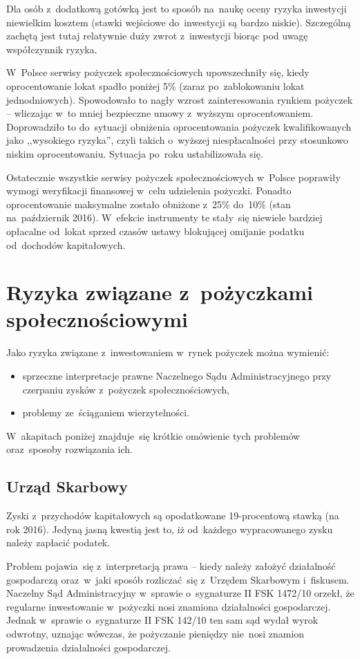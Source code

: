 \documentclass[a4paper,twoside,titlepage,openright]{book}
\begin{document}
Dla osób z~dodatkową gotówką jest to sposób na~naukę oceny ryzyka inwestycji niewielkim kosztem (stawki wejściowe do~inwestycji są bardzo niskie). Szczególną zachętą jest tutaj relatywnie duży zwrot z~inwestycji biorąc pod uwagę współczynnik ryzyka. 

W~Polsce serwisy pożyczek społecznościowych upowszechniły się, kiedy oprocentowanie lokat spadło poniżej 5\% (zaraz po~zablokowaniu lokat jednodniowych).\cite{antybelkowe} Spowodowało to nagły wzrost zainteresowania rynkiem pożyczek -- wliczając w~to mniej bezpieczne umowy z~wyższym oprocentowaniem. Doprowadziło to do~sytuacji obniżenia oprocentowania pożyczek kwalifikowanych jako ,,wysokiego ryzyka'', czyli takich o~wyższej niespłacalności przy stosunkowo niskim oprocentowaniu. Sytuacja po~roku ustabilizowała się. 

Ostatecznie wszystkie serwisy pożyczek społecznościowych w~Polsce poprawiły wymogi weryfikacji finansowej w~celu udzielenia pożyczki. Ponadto oprocentowanie maksymalne zostało obniżone z~25\% do~10\% (stan na~październik 2016). W~efekcie instrumenty te stały~się niewiele bardziej opłacalne od~lokat sprzed czasów ustawy blokującej omijanie podatku od~dochodów kapitałowych.
 
 
\section{Ryzyka związane z~pożyczkami społecznościowymi}

Jako ryzyka związane z~inwestowaniem w~rynek pożyczek można wymienić:

\begin{itemize}
\item sprzeczne interpretacje prawne Naczelnego Sądu Administracyjnego przy czerpaniu zysków z~pożyczek społecznościowych,
\item problemy ze~ściąganiem wierzytelności.
\end{itemize}

W~akapitach poniżej znajduje~się krótkie omówienie tych problemów oraz~sposoby rozwiązania ich.

\subsection*{Urząd Skarbowy}
Zyski z~przychodów kapitałowych są opodatkowane 19-procentową stawką (na rok 2016). Jedyną jasną kwestią jest to, iż od~każdego wypracowanego zysku należy zapłacić podatek. 

Problem pojawia~się z~interpretacją prawa -- kiedy należy założyć działalność gospodarczą oraz~w~jaki sposób rozliczać~się z~Urzędem Skarbowym i~fiskusem. Naczelny Sąd Administracyjny w~sprawie o~sygnaturze II FSK 1472/10 orzekł, że regularne inwestowanie w~pożyczki nosi znamiona działalności gospodarczej.\cite{nsaZnamiona} Jednak w~sprawie o~sygnaturze II FSK 142/10 ten sam sąd wydał wyrok odwrotny, uznając wówczas, że pożyczanie pieniędzy nie~nosi znamion prowadzenia działalności gospodarczej.\cite{nsaWyrokOdwrotny} 
\end{document}
